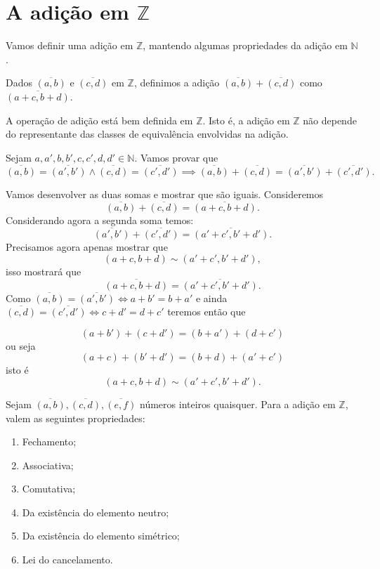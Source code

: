 \documentclass[../main.tex]{subfiles}
\begin{document}
\section{A adição em $\mathbb{Z}$}
Vamos definir uma adição em $\mathbb{Z}$, mantendo algumas propriedades da adição em $\mathbb{N}$.
\begin{defi}\label{int-def-soma}
    Dados $\overline{(a,b)}$ e $\overline{(c,d)}$ em $\mathbb{Z}$, definimos a adição $\overline{(a,b)} + \overline{(c,d)}$ como $\overline{(a+c, b+d)}$.
\end{defi}
\begin{prop}
    A operação de adição está bem definida em $\mathbb{Z}$. Isto é, a adição em $\mathbb{Z}$ não depende do representante das classes de equivalência envolvidas na adição. 
\end{prop}
\begin{dem}
    Sejam $a,a',b,b',c,c',d,d' \in \mathbb{N}$. Vamos provar que 
    \[ \overline{(a,b)} = \overline{(a',b')} \land \overline{(c,d)} = \overline{(c',d')}
    \implies \overline{(a,b)} + \overline{(c,d)} = \overline{(a',b')} + \overline{(c',d')}. \]

    \noindent Vamos desenvolver as duas somas e mostrar que são iguais. Consideremos  
    \[\overline{(a,b)} + \overline{(c,d)} = \overline{(a+c,b+d)}.\]
    Considerando agora a segunda soma temos: 
    \[ \overline{(a',b')} + \overline{(c',d')} = \overline{(a'+c',b'+d')}. \]
    Precisamos agora apenas mostrar que 
    \[ (a+c,b+d) \sim (a'+c',b'+d'), \]
    isso mostrará que 
    \[ \overline{(a+c,b+d)} = \overline{(a'+c',b'+d')}. \] 
    Como $\overline{(a,b)} = \overline{(a',b')} \iff a+b' = b+a'$ e ainda
     $\overline{(c,d)} = \overline{(c',d')} \iff c+d' = d+c'$ teremos então que 
    
         \[ (a+b')+(c+d') = (b+a')+(d+c') \]
         ou seja
         \[ (a+c) + (b'+d') = (b+d) + (a'+c') \]
         isto é
         \[ (a+c,b+d) \sim (a'+c',b'+d'). \]
    
\end{dem}

\begin{teo}\label{int-teo-somaPropriedades}
    Sejam $\overline{(a,b)}, \overline{(c,d)}, \overline{(e,f)}$ números inteiros quaisquer. Para a adição em $\mathbb{Z}$, valem as seguintes propriedades:
    \begin{enumerate}[label=(\roman*)]
        \item Fechamento;
        \item Associativa;
        \item Comutativa;
        \item Da existência do elemento neutro; 
        \item Da existência do elemento simétrico;
        \item Lei do cancelamento.
    \end{enumerate}
\end{teo}
\end{document}
